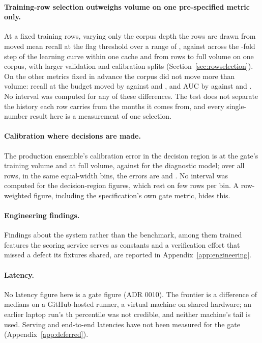 \paragraph{Training-row selection outweighs volume on one pre-specified metric only.} At a fixed
\nTrainUsed{} training rows, varying only the corpus depth the rows are drawn from moved mean recall
at the flag threshold over a range of \nSelMeanRange{}, against \nLcSeedGainAC{} across the
\nLcVolumeFactorAC{}-fold step of the learning curve within one cache and \nFvSeedGainFixed{} from
\nTrainUsed{} rows to full volume on one corpus, with larger validation and calibration splits
(Section~\ref{sec:rowselection}). On the other metrics fixed in advance the corpus did not move more than volume: recall at the
budget moved by \nSelBudgetRange{} against \nLcSeedBudgetGainAC{} and \nFvSeedBudgetGainFixed{}, and
AUC by \nSelAucRange{} against \nLcSeedAucGainAC{} and \nFvSeedAucGainFixed{}. No interval was
computed for any of these differences. The test does not separate the history each row carries from the
months it comes from, and every single-number result here is a measurement of one selection.

\paragraph{Calibration where decisions are made.} The production ensemble's calibration error in the
decision region is \nGateCalRegionECE{} at the gate's training volume and \nFvCalRegionECE{} at full
volume, against \nBatECEDecision{} for the diagnostic model; over all rows, in the same equal-width
bins, the errors are \nGateCalECEAll{} and \nFvCalECEAll{}. No interval was computed for the decision-region figures,
which rest on few rows per bin. A row-weighted figure, including the specification's own gate metric, hides this.

\paragraph{Engineering findings.} Findings about the system rather than the benchmark, among
them trained features the scoring service serves as constants and a verification effort that missed a
defect its fixtures shared, are reported in Appendix~\ref{app:engineering}.

\paragraph{Latency.} No latency figure here is a gate figure (ADR 0010). The frontier is a difference of
medians on a GitHub-hosted runner, a virtual machine on shared hardware; an earlier laptop run's
\nPctlTail{}th percentile was not credible, and neither machine's tail is used. Serving and
end-to-end latencies have not been measured for the gate (Appendix~\ref{app:deferred}).


